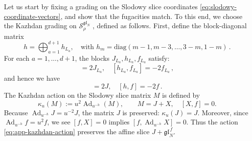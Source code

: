 \documentclass[12pt,a4paper]{article}
\begin{document}
Let us start by fixing a grading on the Slodowy slice coordinates \eqref{eq:slodowy-coordinate-vectors}, and show that the fugacities match.  
To this end, we choose the Kazhdan grading on $\mathcal S^{\mathfrak{gl}_N}_\rho$ \cite{gan2013,Ambrosio2023}, defined as follows. First, define the block-diagonal matrix
\begin{equation}
    h=\bigoplus_{a=1}^{d+1}h_{L_a},\quad \text{with }h_m=\text{diag}(m-1,m-3,\dots,3-m,1-m)\,.
\end{equation}
For each $a=1,\dots,d+1$, the blocks $J_{L_a},h_{L_a},f_{L_a}$ satisfy:
\begin{equation}
    [h_{L_a},J_{L_a}]=2J_{L_a},\quad [h_{L_a},f_{L_a}]=-2f_{L_a}\,,
\end{equation}
and hence we have 
\begin{equation}
    [h,J]=2J,\quad [h,f]=-2f\,.
\end{equation}
The Kazhdan action on the Slodowy slice matrix $M$ is defined by
\begin{equation}
 \kappa_u(M):=u^2\operatorname{Ad}_{u^{-h}}(M),
 \qquad M=J+X,\quad [X,f]=0.
 \label{eq:app-kazhdan-action}
\end{equation}
Because $\operatorname{Ad}_{u^{-h}}J=u^{-2}J$, the matrix $J$ is
preserved: $\kappa_u(J)=J$.  Moreover, since 
$\operatorname{Ad}_{u^{-h}}f=u^2f$, we see $[f,X]=0$ implies
$[f,\operatorname{Ad}_{u^{-h}}X]=0$.  Thus the action \eqref{eq:app-kazhdan-action}
preserves the affine slice $J+\mathfrak{gl}_N^{\,f}$.  
\end{document}
